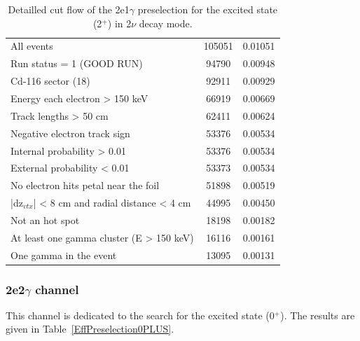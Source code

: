\documentclass[main.tex]{subfiles}
\begin{document}
\begin{table}[h!]
\begin{center}
\begin{tabular}{l|c|c}
                                                           All events  &     105051   &      0.01051\\
                                            Run status = 1 (GOOD RUN)  &      94790   &      0.00948\\
                                                   Cd-116 sector (18)  &      92911   &      0.00929\\
                                       Energy each electron > 150 keV  &      66919   &      0.00669\\
                                                Track lengths > 50 cm  &      62411   &      0.00624\\
                                          Negative electron track sign &      53376   &      0.00534\\
                                           Internal probability > 0.01 &      53376   &      0.00534\\
                                           External probability < 0.01 &      53373   &      0.00534\\
                                  No electron hits petal near the foil &      51898   &      0.00519\\
                        |dz$_{vtx}$| < 8 cm and radial distance < 4 cm &      44995   &      0.00450\\
                                                       Not an hot spot &      18198   &      0.00182\\
                              At least one gamma cluster (E > 150 keV) &      16116   &      0.00161\\
                                                One gamma in the event &      13095   &      0.00131\\
\bottomrule
\end{tabular}
\caption{Detailled cut flow of the 2e1$\gamma$ preselection for the excited state (2$^+$) in 2$\nu$ decay mode.}
\label{CutFlowPreselection2PLUS}
\end{center}
\end{table}
\fi

\subsubsection{2e2$\gamma$ channel}


\NI This channel is dedicated to the search for the excited state (0$^+$). The results are given in Table~\ref{EffPreselection0PLUS}.
\end{document}
